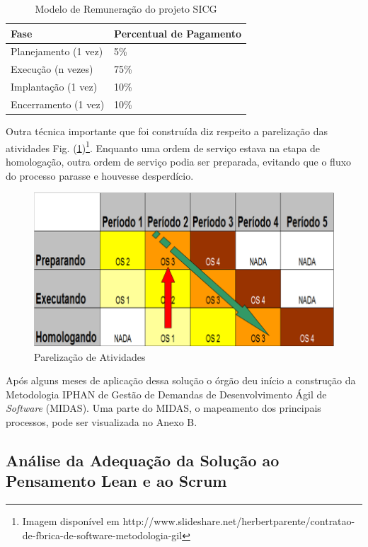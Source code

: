 \begin{table}[H]
\center
\footnotesize
\begin{tabular}{|p{6cm}|p{6cm}|}
  \hline
   \textbf{Fase} & \textbf{Percentual de Pagamento}\\
    \hline
   Planejamento (1 vez) & 5\%\\
   \hline    
   Execução (n vezes) & 75\%\\
    \hline
   Implantação (1 vez) & 10\%\\
   \hline
   Encerramento (1 vez) & 10\%\\
   \hline
\end{tabular}
\caption{Modelo de Remuneração do projeto SICG}
\label{remuneracao}
\end{table}


Outra técnica importante que foi construída diz respeito a parelização das atividades Fig. (\ref{kanban5})\footnote{Imagem disponível em http://www.slideshare.net/herbertparente/contratao-de-fbrica-de-software-metodologia-gil}. Enquanto uma ordem de serviço estava na etapa de homologação, outra ordem de serviço podia ser preparada, evitando que o fluxo do processo parasse e houvesse desperdício. 

\begin{figure}[H]
		\centering
		
			\includegraphics[scale=0.5]{figuras/kanbanIPHAN5.png}
		\caption{Parelização de Atividades}
		\label{kanban5}
\end{figure}

Após alguns meses de aplicação dessa solução o órgão deu início a construção da Metodologia IPHAN de Gestão de Demandas de Desenvolvimento Ágil de \textit{Software} (MIDAS). Uma parte do MIDAS, o mapeamento dos principais processos, pode ser visualizada no Anexo B.


\subsection[Análise da Adequação da Solução ao Pensamento Lean e ao Scrum]{Análise da Adequação da Solução ao Pensamento Lean e ao Scrum}


